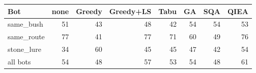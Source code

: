 \begin{tabular}{lrrrrrrr}
\toprule
Bot & none & Greedy & Greedy+LS & Tabu & GA & SQA & QIEA \\
\midrule
same\_bush & 51 & 43 & 48 & 42 & 54 & 54 & 53 \\
same\_route & 77 & 41 & 77 & 71 & 60 & 49 & 76 \\
stone\_lure & 34 & 60 & 45 & 45 & 47 & 42 & 54 \\
\midrule
all bots & 54 & 48 & 57 & 53 & 54 & 48 & 61 \\
\bottomrule
\end{tabular}
